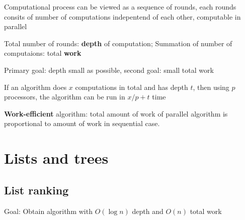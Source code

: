 Computational process can be viewed as a sequence of rounds, each rounds consits of number of computations indepentend of each other, computable in parallel 

Total number of rounds: \textbf{depth} of computation; Summation of number of computaions: total \textbf{work} 

Primary goal: depth small as possible, second goal: small total work

\begin{theorem}
    If an algorithm does $x$ computations in total and has depth $t$, then using $p$ processors, the algorithm can be run in $x/p + t$ time
\end{theorem}

\textbf{Work-efficient} algorithm: total amount of work of parallel algorithm is proportional to amount of work in sequential case.

\section{Lists and trees}
\subsection{List ranking}
Goal: Obtain algorithm with $O(\log n)$ depth and $O(n)$ total work


